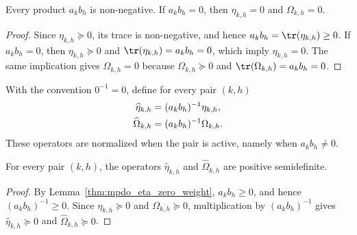 \begin{lemma}
    \label{thm:mpdo_eta_zero_weight}
    \leanok
    Every product $a_kb_h$ is non-negative. If $a_kb_h=0$, then
    $\eta_{k,h}=0$ and $\Omega_{k,h}=0$.
\end{lemma}
\begin{proof}
    \leanok
    Since $\eta_{k,h}\succeq 0$, its trace is non-negative, and hence
    $a_kb_h=\tr(\eta_{k,h})\geq 0$. If $a_kb_h=0$, then
    $\eta_{k,h}\succeq 0$ and $\tr(\eta_{k,h})=a_kb_h=0$, which imply
    $\eta_{k,h}=0$.
    The same implication gives $\Omega_{k,h}=0$ because
    $\Omega_{k,h}\succeq 0$ and
    $\tr(\Omega_{k,h})=a_kb_h=0$.
\end{proof}

\begin{definition}
    \label{def:mpdo_normalized_eta_omega}
    \leanok
    With the convention $0^{-1}=0$, define for every pair $(k,h)$
    \begin{align}
        \widehat\eta_{k,h}
         & =(a_kb_h)^{-1}\eta_{k,h}, \notag   \\
        \widehat\Omega_{k,h}
         & =(a_kb_h)^{-1}\Omega_{k,h}. \notag
    \end{align}
    These operators are normalized when the pair is active, namely when
    $a_kb_h\ne0$.
\end{definition}

\begin{lemma}
    \label{thm:mpdo_normalized_eta_omega_pos}
    \leanok
    For every pair $(k,h)$, the operators $\widehat\eta_{k,h}$ and
    $\widehat\Omega_{k,h}$ are positive semidefinite.
\end{lemma}
\begin{proof}
    \leanok
    By Lemma~\ref{thm:mpdo_eta_zero_weight}, $a_kb_h\geq 0$, and hence
    $(a_kb_h)^{-1}\geq 0$. Since $\eta_{k,h}\succeq 0$ and
    $\Omega_{k,h}\succeq 0$, multiplication by $(a_kb_h)^{-1}$ gives
    $\widehat\eta_{k,h}\succeq 0$ and
    $\widehat\Omega_{k,h}\succeq 0$.
\end{proof}


